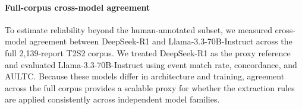 \paragraph{Full-corpus cross-model agreement}
\label{ch06:sec:full_corpus_agreement_methods}
To estimate reliability beyond the human-annotated subset, we measured cross-model agreement between DeepSeek-R1 and Llama-3.3-70B-Instruct across the full 2,139-report T2S2 corpus.
We treated DeepSeek-R1 as the proxy reference and evaluated Llama-3.3-70B-Instruct using event match rate, concordance, and AULTC.
Because these models differ in architecture and training, agreement across the full corpus provides a scalable proxy for whether the extraction rules are applied consistently across independent model families.




